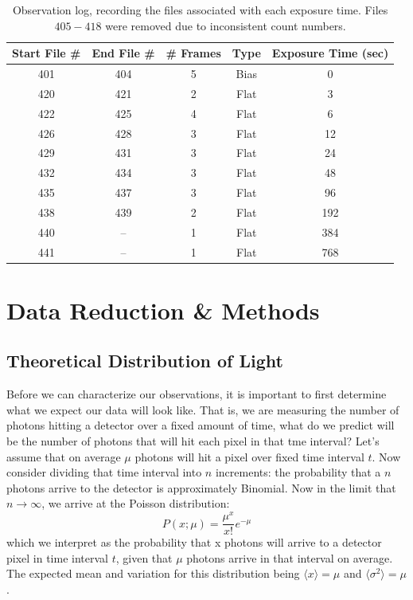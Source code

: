 \documentclass[preprint]{aastex62}
\begin{document}
\begin{table}[H]
\centering
\begin{tabular}{|c|c|c|c|c|}
    \hline
    Start File \# & End File \# & \# Frames & Type  & Exposure Time (sec) \\
    \hline
    \hline
    401 & 404 & 5 & Bias & 0  \\
    420 & 421 & 2 & Flat & 3 \\
    422 & 425 & 4 & Flat & 6 \\
    426 & 428 & 3 & Flat & 12 \\
    429 & 431 & 3 & Flat & 24 \\
    432 & 434 & 3 & Flat & 48 \\
    435 & 437 & 3 & Flat & 96 \\
    438 & 439 & 2 & Flat & 192 \\
    440 & --  & 1 & Flat & 384 \\
    441 & --  & 1 & Flat & 768 \\
    \hline
\end{tabular}
\caption{Observation log, recording the files associated with each exposure time. Files $405-418$ were removed due to inconsistent count numbers.} \label{table:log}
\end{table}


\section{Data Reduction \& Methods}
\subsection{Theoretical Distribution of Light}
Before we can characterize our observations, it is important to first determine what we expect our data will look like. That is, we are measuring the number of photons hitting a detector over a fixed amount of time, what do we predict will be the number of photons that will hit each pixel in that tme interval? Let's assume that on average $\mu$ photons will hit a pixel over fixed time interval $t$. Now consider dividing that time interval into $n$ increments: the probability that a $n$ photons arrive to the detector is approximately Binomial. Now in the limit that $n\rightarrow\infty$, we arrive at the Poisson distribution:
\begin{equation}
P(x;\mu) = \frac{\mu^x}{x!}e^{-\mu}
\end{equation}
which we interpret as the probability that x photons will arrive to a detector pixel in time interval $t$, given that $\mu$ photons arrive in that interval on average. The expected mean and variation for this distribution being $\langle x \rangle = \mu$ and $\langle \sigma^2 \rangle = \mu$. 
\end{document}
